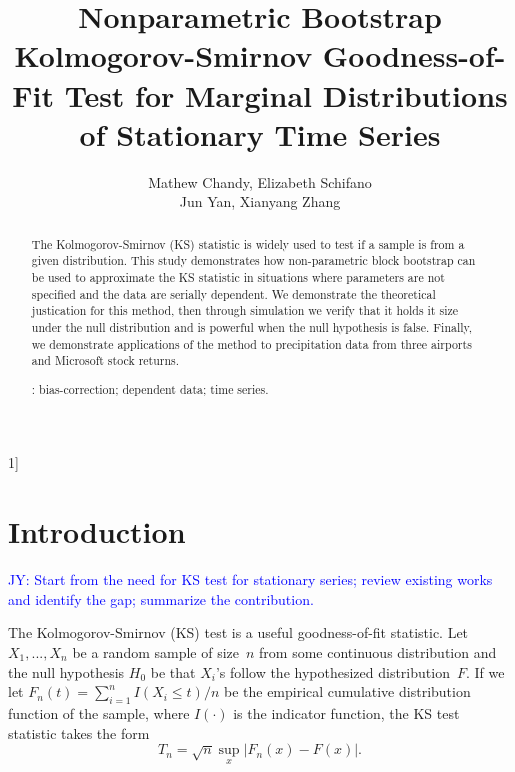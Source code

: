\documentclass[12pt, titlepage, letterpaper]{article}
\newcommand{\jy}[1]{\textcolor{blue}{JY: #1}}
\newcommand{\blind}{1]}
\begin{document}

\title{\bf Nonparametric Bootstrap Kolmogorov-Smirnov Goodness-of-Fit Test for
  Marginal Distributions of Stationary Time Series}
\blind
{
  \author{Mathew Chandy, %
  Elizabeth Schifano\\
  Jun Yan, %
  Xianyang Zhang\\
} \fi


\maketitle


\begin{abstract}

The Kolmogorov-Smirnov (KS) statistic is widely used to test if a sample is
from a given distribution. This study demonstrates how non-parametric 
block bootstrap can be 
used to approximate the KS statistic in situations where parameters are 
not specified and the data are serially dependent. We demonstrate the 
theoretical justication for this method, then through simulation we verify that
it holds it size under the null distribution and is powerful when the null 
hypothesis is false. Finally, we demonstrate applications of the method to
precipitation data from three airports and Microsoft stock returns.

\bigskip
{}:
bias-correction; 
dependent data; 
time series. 
\end{abstract}

\doublespace 


\section{Introduction}
\label{sec:intro}

\jy{Start from the need for KS test for stationary series; review existing works
  and identify the gap; summarize the contribution.}

The Kolmogorov-Smirnov (KS) test is a useful goodness-of-fit statistic. 
Let $X_1, ..., X_n$ be a random sample of size~$n$ from some continuous
distribution and the null hypothesis $H_0$ be that $X_i$'s follow the
hypothesized distribution~$F$.
If we let $F_n(t) = \sum_{i=1}^n I(X_i \le t) / n$ be the empirical cumulative
distribution function of the sample, where $I(\cdot)$ is the indicator
function, the KS test statistic takes the form
\begin{equation}
  \label{eq:ks_standard}
  T_n = \sqrt{n} \sup_x | F_{n}(x) - F(x) |.
\end{equation}


}
\end{document}
